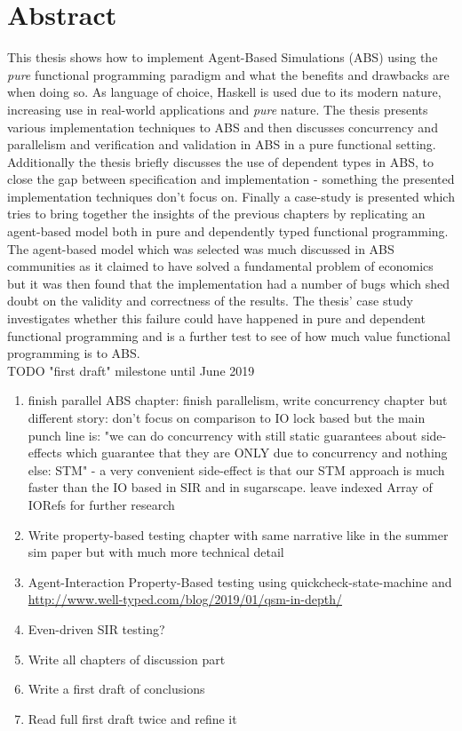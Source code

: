 \documentclass[oneside]{book}
\begin{document}
\section*{Abstract}
This thesis shows how to implement Agent-Based Simulations (ABS) using the \textit{pure} functional programming paradigm and what the benefits and drawbacks are when doing so. As language of choice, Haskell is used due to its modern nature, increasing use in real-world applications and \textit{pure} nature. The thesis presents various implementation techniques to ABS and then discusses concurrency and parallelism and verification and validation in ABS in a pure functional setting. Additionally the thesis briefly discusses the use of dependent types in ABS, to close the gap between specification and implementation - something the presented implementation techniques don't focus on.
Finally a case-study is presented which tries to bring together the insights of the previous chapters by replicating an agent-based model both in pure and dependently typed functional programming. The agent-based model which was selected was much discussed in ABS communities as it claimed to have solved a fundamental problem of economics but it was then found that the implementation had a number of bugs which shed doubt on the validity and correctness of the results. The thesis' case study investigates whether this failure could have happened in pure and dependent functional programming and is a further test to see of how much value functional programming is to ABS. \\


TODO "first draft" milestone until June 2019
\begin{enumerate}
	\item finish parallel ABS chapter: finish parallelism, write concurrency chapter but different story: don't focus on comparison to IO lock based but the main punch line is: "we can do concurrency with still static guarantees about side-effects which guarantee that they are ONLY due to concurrency and nothing else: STM" - a very convenient side-effect is that our STM approach is much faster than the IO based in SIR and in sugarscape. leave indexed Array of IORefs for further research
	
	\item Write property-based testing chapter with same narrative like in the summer sim paper but with much more technical detail
	
	\item Agent-Interaction Property-Based testing using quickcheck-state-machine and \cite{de_vries_-depth_2019} \url{http://www.well-typed.com/blog/2019/01/qsm-in-depth/}
	
	\item Even-driven SIR testing?
	
	\item Write all chapters of discussion part	
	
	\item Write a first draft of conclusions	
	
	\item Read full first draft twice and refine it
\end{enumerate}
\end{document}
